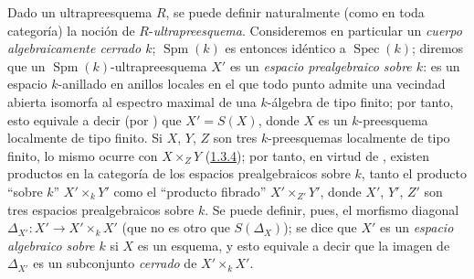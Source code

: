 \begin{env}[10.10.2]
\label{IV.10.10.2}
Dado un ultrapreesquema $R$, se puede definir naturalmente (como en toda categoría) la noción de $R$-\emph{ultrapreesquema}.
Consideremos en particular un \emph{cuerpo algebraicamente cerrado $k$}; $\operatorname{Spm}(k)$ es entonces idéntico a $\operatorname{Spec}(k)$; diremos que un $\operatorname{Spm}(k)$-ultrapreesquema $X'$ es un \emph{espacio prealgebraico sobre $k$}: es un espacio $k$-anillado en anillos locales en el que todo punto admite una vecindad abierta isomorfa al espectro maximal de una $k$-álgebra de tipo finito; por tanto, esto equivale a decir (por ) que $X'=S(X)$, donde $X$ es un $k$-preesquema localmente de tipo finito.
Si $X$, $Y$, $Z$ son tres $k$-preesquemas localmente de tipo finito, lo mismo ocurre con $X\times_ZY$ \textup{(\hyperref[subsection:I.3.4]{1.3.4})}; por tanto, en virtud de , existen productos en la categoría de los espacios prealgebraicos sobre $k$, tanto el producto ``sobre $k$'' $X'\times_kY'$ como el ``producto fibrado'' $X'\times_{Z'}Y'$, donde $X'$, $Y'$, $Z'$ son tres espacios prealgebraicos sobre $k$.
Se puede definir, pues, el morfismo diagonal $\Delta_{X'}:X'\to X'\times_kX'$ (que no es otro que $S(\Delta_X)$); se dice que $X'$ es un \emph{espacio algebraico sobre $k$} si $X$ es un esquema, y esto equivale a decir que la imagen de $\Delta_{X'}$ es un subconjunto \emph{cerrado} de $X'\times_kX'$.
\end{env}

